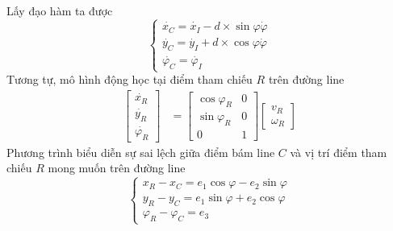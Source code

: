           \hspace*{0.6cm}Lấy đạo hàm ta được 
          \begin{equation}
               \begin{cases}
                    \dot{x_C} = \dot{x_I} - d \times \sin \varphi \dot{\varphi} \\[0.5em]
                    \dot{y_C} = \dot{y_I} + d \times \cos \varphi \dot{\varphi} \\[0.5em]
                    \dot{\varphi_C} = \dot{\varphi_I}
               \end{cases}
               \label{c5_e3}            
          \end{equation}
          \hspace*{0.6cm}Tương tự, mô hình động học tại điểm tham chiếu $R$ trên đường line
          \begin{align}
               \begin{bmatrix}
                    \dot{x_R} \\
                    \dot{y_R} \\
                    \dot{\varphi_R}
                    \end{bmatrix} &= \begin{bmatrix}
                    \cos\varphi_R & 0 \\
                    \sin\varphi_R & 0 \\
                    0 & 1
                    \end{bmatrix} \begin{bmatrix}
                    v_R \\
                    \omega_R
               \end{bmatrix}
               \label{c5_e4}
          \end{align}
          \hspace*{0.6cm}Phương trình biểu diễn sự sai lệch giữa điểm bám line $C$ và vị trí điểm tham chiếu $R$ mong muốn trên đường line
          \begin{equation}
               \begin{cases}
                    x_R - x_C = e_1 \cos \varphi - e_2 \sin \varphi \\[0.5em]
                    y_R - y_C = e_1 \sin \varphi + e_2 \cos \varphi \\[0.5em]
                    \varphi_R - \varphi_C = e_3
               \end{cases}    
               \label{c5_e5}           
          \end{equation}
